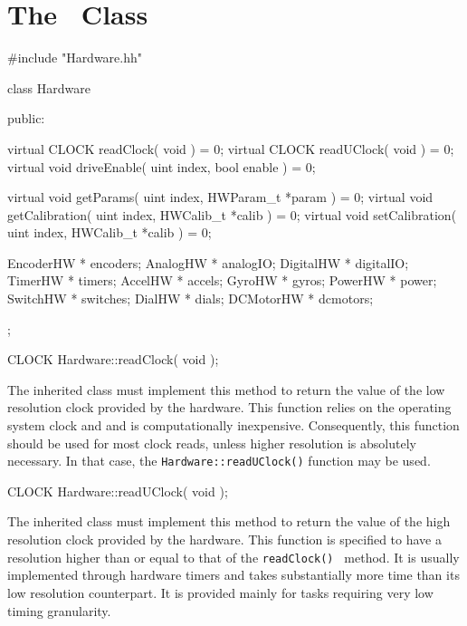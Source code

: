 \section{The \Hardware\ Class}
\label{sec:hardware_class}

\begin{codesegment}
#include "Hardware.hh"
\end{codesegment}

\begin{classdef}
class Hardware {
public:

  virtual CLOCK readClock( void ) = 0;
  virtual CLOCK readUClock( void ) = 0;
  virtual void driveEnable( uint index, bool enable ) = 0;

  virtual void getParams( uint index, HWParam_t *param ) = 0;
  virtual void getCalibration( uint index, HWCalib_t *calib ) = 0;
  virtual void setCalibration( uint index, HWCalib_t *calib ) = 0;

  EncoderHW   * encoders;
  AnalogHW    * analogIO;
  DigitalHW   * digitalIO;
  TimerHW     * timers;
  AccelHW     * accels;
  GyroHW      * gyros;
  PowerHW     * power;
  SwitchHW    * switches;
  DialHW      * dials;
  DCMotorHW   * dcmotors;
};
\end{classdef}

\begin{prototype}
CLOCK Hardware::readClock( void );
\end{prototype}

The inherited class must implement this method to return the value of the
low resolution clock provided by the hardware. This function relies on the
operating system clock and and is computationally inexpensive. Consequently,
this function should be used for most clock reads, unless higher resolution
is absolutely necessary.  In that case, the {\tt Hardware::readUClock()}
function may be used.

\begin{prototype}
CLOCK Hardware::readUClock( void );
\end{prototype}

The inherited class must implement this method to return the value of the
high resolution clock provided by the hardware. This function is specified
to have a resolution higher than or equal to that of the {\tt readClock() }
method. It is usually implemented through hardware timers and takes
substantially more time than its low resolution counterpart. It is provided
mainly for tasks requiring very low timing granularity.

